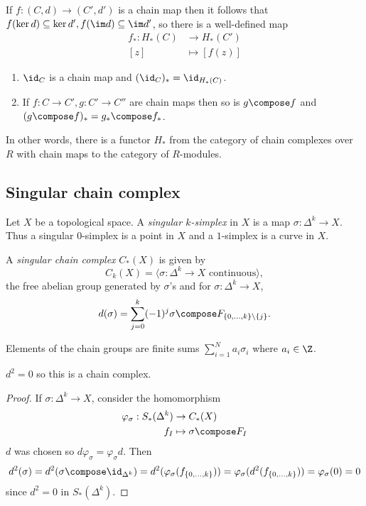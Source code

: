 \documentclass[a4paper]{article}
\begin{document}
If \(f: (C, d) \to (C', d')\) is a chain map then it follows that \(f(\ker d) \subseteq \ker d', f(\im d) \subseteq \im d'\), so there is a well-defined map
\begin{align*}
  f_*: H_*(C) &\to H_*(C') \\
  [z] &\mapsto [f(z)]
\end{align*}

\begin{lemma}\leavevmode
  \begin{enumerate}
  \item \(\id_C\) is a chain map and \((\id_C)_* = \id_{H_*(C)}\).
  \item If \(f: C \to C', g: C' \to C''\) are chain maps then so is \(g \compose f\) and \((g \compose f)_* = g_* \compose f_*\).
  \end{enumerate}
  In other words, there is a functor \(H_*\) from the category of chain complexes over \(R\) with chain maps to the category of \(R\)-modules.
\end{lemma}

\subsection{Singular chain complex}

Let \(X\) be a topological space. A \emph{singular \(k\)-simplex} in \(X\) is a map \(\sigma: \Delta^k \to X\). Thus a singular \(0\)-simplex is a point in \(X\) and a \(1\)-simplex is a curve in \(X\).

\begin{definition}
  A \emph{singular chain complex} \(C_*(X)\) is given by
  \[
    C_k(X) = \langle \sigma: \Delta^k \to X \text{ continuous} \rangle,
  \]
  the free abelian group generated by \(\sigma\)'s and for \(\sigma: \Delta^k \to X\),
  \[
    d(\sigma) = \sum_{j = 0}^k (-1)^j \sigma \compose F_{\{0, \dots, k\} \setminus \{j\}}.
  \]
\end{definition}

Elements of the chain groups are finite sums \(\sum_{i = 1}^N a_i \sigma_i\) where \(a_i \in \Z\).

\begin{lemma}
  \(d^2 = 0\) so this is a chain complex.
\end{lemma}

\begin{proof}
  If \(\sigma: \Delta^k \to X\), consider the homomorphism
  \begin{align*}
    \varphi_\sigma: S_*(\Delta^k) &\to C_*(X) \\
    f_I &\mapsto \sigma \compose F_I
  \end{align*}
  \(d\) was chosen so \(d \varphi_\sigma = \varphi_\sigma d\). Then
  \[
    d^2(\sigma) = d^2(\sigma \compose \id_{\Delta^k}) = d^2(\varphi_\sigma(f_{\{0, \dots, k\}}))
    = \varphi_\sigma(d^2(f_{\{0, \dots, k\}})) = \varphi_\sigma(0) = 0
  \]
  since \(d^2 = 0\) in \(S_*(\Delta^k)\).
\end{proof}
\end{document}
